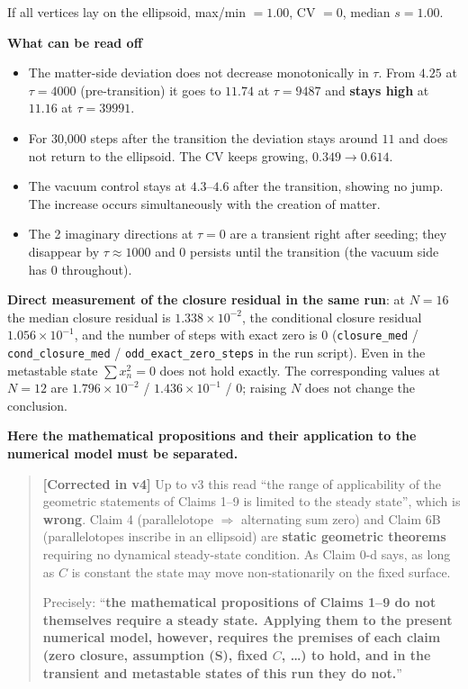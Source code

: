 \documentclass[
  10pt,
]{article}
\providecommand{\tightlist}{%
  \setlength{\itemsep}{0pt}\setlength{\parskip}{0pt}}
\begin{document}
If all vertices lay on the ellipsoid, max/min \(=1.00\), CV \(=0\),
median \(s=1.00\).

\textbf{What can be read off}

\begin{itemize}
\tightlist
\item
  The matter-side deviation does not decrease monotonically in \(\tau\).
  From \(4.25\) at \(\tau=4000\) (pre-transition) it goes to \(11.74\)
  at \(\tau=9487\) and \textbf{stays high} at \(11.16\) at
  \(\tau=39991\).
\item
  For 30,000 steps after the transition the deviation stays around
  \(11\) and does not return to the ellipsoid. The CV keeps growing,
  \(0.349 \to 0.614\).
\item
  The vacuum control stays at \(4.3\)--\(4.6\) after the transition,
  showing no jump. The increase occurs simultaneously with the creation
  of matter.
\item
  The 2 imaginary directions at \(\tau=0\) are a transient right after
  seeding; they disappear by \(\tau\approx1000\) and 0 persists until
  the transition (the vacuum side has 0 throughout).
\end{itemize}

\textbf{Direct measurement of the closure residual in the same run}: at
\(N=16\) the median closure residual is \(1.338\times10^{-2}\), the
conditional closure residual \(1.056\times10^{-1}\), and the number of
steps with exact zero is \(0\) (\texttt{closure\_med} /
\texttt{cond\_closure\_med} / \texttt{odd\_exact\_zero\_steps} in the
run script). Even in the metastable state \(\sum x_n^2 = 0\) does not
hold exactly. The corresponding values at \(N=12\) are
\(1.796\times10^{-2}\) / \(1.436\times10^{-1}\) / \(0\); raising \(N\)
does not change the conclusion.

\textbf{Here the mathematical propositions and their application to the
numerical model must be separated.}

\begin{quote}
\textbf{{[}Corrected in v4{]}} Up to v3 this read ``the range of
applicability of the geometric statements of Claims 1--9 is limited to
the steady state'', which is \textbf{wrong}. Claim 4 (parallelotope
\(\Rightarrow\) alternating sum zero) and Claim 6B (parallelotopes
inscribe in an ellipsoid) are \textbf{static geometric theorems}
requiring no dynamical steady-state condition. As Claim 0-d says, as
long as \(C\) is constant the state may move non-stationarily on the
fixed surface.

Precisely: ``\textbf{the mathematical propositions of Claims 1--9 do not
themselves require a steady state. Applying them to the present
numerical model, however, requires the premises of each claim (zero
closure, assumption (S), fixed \(C\), \ldots) to hold, and in the
transient and metastable states of this run they do not.}''
\end{quote}
\end{document}
